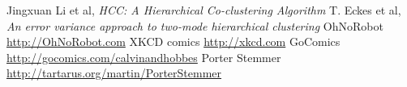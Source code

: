 \documentclass[11pt]{article}
\begin{document}
\begin{thebibliography}{9}
 Jingxuan Li et al, \emph{HCC: A Hierarchical Co-clustering Algorithm}
 T. Eckes et al, \emph{An error variance approach to
    two-mode hierarchical clustering}
 OhNoRobot \url{http://OhNoRobot.com}
 XKCD comics \url{http://xkcd.com}
 GoComics \url{http://gocomics.com/calvinandhobbes}
 Porter Stemmer \url{http://tartarus.org/martin/PorterStemmer}
\end{thebibliography}
\end{document}
